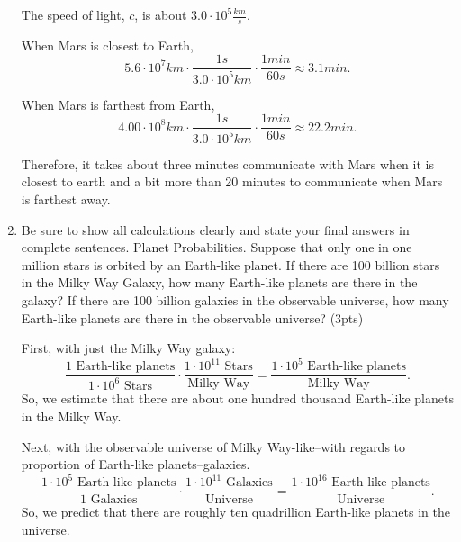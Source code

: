 \documentclass{article}
\begin{document}
\begin{enumerate}[start=15]
    The speed of light, $c$, is about $3.0 \cdot 10^5 \si{\frac{km}{s}}$.

    When Mars is closest to Earth,
    \[5.6 \cdot 10^7 \si{km} \cdot \frac{1 \si{s}}{3.0 \cdot 10^5 \si{km}} \cdot \frac{1 \si{min}}{60 \si{s}} \approx 3.1 \si{min}.\]

    When Mars is farthest from Earth,
    \[4.00 \cdot 10^8 \si{km} \cdot \frac{1 \si{s}}{3.0 \cdot 10^5 \si{km}} \cdot \frac{1 \si{min}}{60 \si{s}} \approx 22.2 \si{min}.\]

    Therefore, it takes about three minutes communicate with Mars when it is closest to earth and a bit more than 20 minutes to communicate when Mars is farthest away.

    \item Be sure to show all calculations clearly and state your final answers in complete sentences. Planet Probabilities. Suppose that only one in one million stars is orbited by an Earth-like planet. 
    If there are 100 billion stars in the Milky Way Galaxy, how many Earth-like planets are there in the galaxy? 
    If there are 100 billion galaxies in the observable universe, how many Earth-like planets are there in the observable universe? (3pts)
    
    First, with just the Milky Way galaxy:
    \[\frac{1 \text{ Earth-like planets}}{1 \cdot 10^6 \text{ Stars}} \cdot \frac{1 \cdot 10^{11} \text{ Stars}}{\text{Milky Way}} = \frac{1 \cdot 10^5 \text{ Earth-like planets}}{\text{Milky Way}}.\]
    So, we estimate that there are about one hundred thousand Earth-like planets in the Milky Way.

    Next, with the observable universe of Milky Way-like--with regards to proportion of Earth-like planets--galaxies.
    \[\frac{1 \cdot 10^5 \text{ Earth-like planets}}{1 \text{ Galaxies}} \cdot \frac{1 \cdot 10^{11} \text{ Galaxies}}{\text{Universe}} = \frac{1 \cdot 10^{16} \text{ Earth-like planets}}{\text{Universe}}.\]
    So, we predict that there are roughly ten quadrillion Earth-like planets in the universe.

\end{enumerate}
\end{document}
